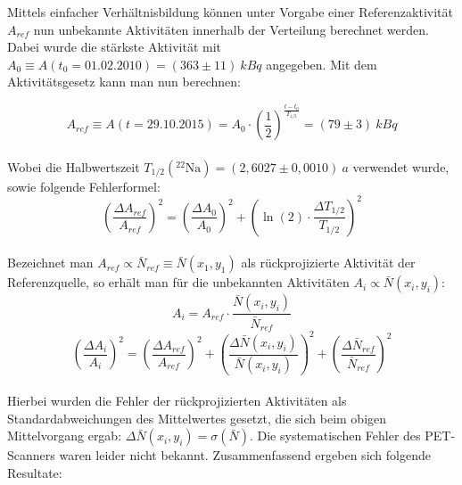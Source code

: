             Mittels einfacher Verhältnisbildung können unter Vorgabe einer Referenzaktivität $A_{ref}$ nun unbekannte Aktivitäten innerhalb der Verteilung berechnet werden. Dabei wurde die stärkste Aktivität mit $A_0 \equiv A(t_0 = \textrm{01.02.2010}) = (363 \pm 11)\ \unit{kBq}$ angegeben. Mit dem Aktivitätsgesetz kann man nun berechnen:
            
            \begin{equation}
            	A_{ref} \equiv A(t =\textrm{29.10.2015}) = A_0 \cdot \left( \frac{1}{2}\right)^{\frac{t-t_0}{T_{1/2}}} = (79 \pm 3)\ \unit{kBq}
            \end{equation}\\
            Wobei die Halbwertszeit $T_{1/2}(^{22}\textrm{Na}) = (2,6027 \pm 0,0010)\ \unit{a}$ verwendet wurde, sowie folgende Fehlerformel:
            \begin{equation}
                \left(\frac{\Delta A_{ref}}{A_{ref}}\right)^2 = \left(\frac{\Delta A_0}{A_0}\right)^2 + \left(\ln(2) \cdot \frac{\Delta T_{1/2}}{T_{1/2}}\right)^2
            \end{equation}\\   
            Bezeichnet man $A_{ref} \propto \bar{N}_{ref} \equiv \bar{N}(x_1,y_1)$ als rückprojizierte Aktivität der Referenzquelle, so erhält man für die unbekannten Aktivitäten $A_i \propto \bar{N}(x_i,y_i)$:
            \begin{equation}
            	A_i = A_{ref} \cdot \frac{\bar{N}(x_i,y_i)}{\bar{N}_{ref}}
            \end{equation}    
            \begin{equation}
                 \left(\frac{\Delta A_i}{A_i}\right)^2 = \left(\frac{\Delta A_{ref}}{A_{ref}}\right)^2 + \left(\frac{\Delta \bar{N}(x_i,y_i)}{\bar{N}(x_i,y_i)}\right)^2 + \left(\frac{\Delta \bar{N}_{ref}}{\bar{N}_{ref}}\right)^2
             \end{equation}\\   
             Hierbei wurden die Fehler der rückprojizierten Aktivitäten als Standardabweichungen des Mittelwertes gesetzt, die sich beim obigen Mittelvorgang ergab: $\Delta \bar{N}(x_i,y_i) = \sigma(\bar{N})$. Die systematischen Fehler des PET-Scanners waren leider nicht bekannt. Zusammenfassend ergeben sich folgende Resultate:\\
             
